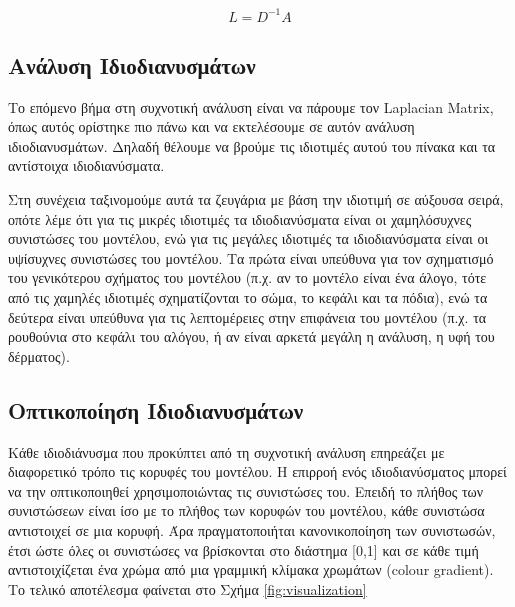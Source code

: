\documentclass[draft]{article}
\begin{document}
\[
	L = D^{-1}A
\]

\subsection{Ανάλυση Ιδιοδιανυσμάτων}
Το επόμενο βήμα στη συχνοτική ανάλυση είναι να πάρουμε τον Laplacian Matrix,
όπως αυτός ορίστηκε πιο πάνω και να εκτελέσουμε σε αυτόν ανάλυση ιδιοδιανυσμάτων.
Δηλαδή θέλουμε να βρούμε τις ιδιοτιμές αυτού του πίνακα και τα αντίστοιχα ιδιοδιανύσματα.

Στη συνέχεια ταξινομούμε αυτά τα ζευγάρια με βάση την ιδιοτιμή σε αύξουσα σειρά,
οπότε λέμε ότι για τις μικρές ιδιοτιμές τα ιδιοδιανύσματα είναι οι χαμηλόσυχνες
συνιστώσες του μοντέλου,
ενώ για τις μεγάλες ιδιοτιμές τα ιδιοδιανύσματα είναι οι υψίσυχνες συνιστώσες του μοντέλου.
Τα πρώτα είναι υπεύθυνα για τον σχηματισμό του γενικότερου σχήματος του μοντέλου
(π.χ. αν το μοντέλο είναι ένα άλογο, τότε από τις χαμηλές ιδιοτιμές σχηματίζονται το
σώμα, το κεφάλι και τα πόδια), ενώ τα δεύτερα είναι υπεύθυνα για τις λεπτομέρειες στην
επιφάνεια του μοντέλου (π.χ. τα ρουθούνια στο κεφάλι του αλόγου,
ή αν είναι αρκετά μεγάλη η ανάλυση, η υφή του δέρματος).

\subsection{Οπτικοποίηση Ιδιοδιανυσμάτων}
Κάθε ιδιοδιάνυσμα που προκύπτει από τη συχνοτική ανάλυση επηρεάζει με διαφορετικό τρόπο
τις κορυφές του μοντέλου. Η επιρροή ενός ιδιοδιανύσματος μπορεί να την οπτικοποιηθεί
χρησιμοποιώντας τις συνιστώσες του. Επειδή το πλήθος των συνιστώσεων είναι ίσο με το
πλήθος των κορυφών του μοντέλου, κάθε συνιστώσα αντιστοιχεί σε μια κορυφή.
Άρα πραγματοποιήται κανονικοποίηση των συνιστωσών, έτσι ώστε όλες οι συνιστώσες να
βρίσκονται στο διάστημα [0,1] και σε κάθε τιμή αντιστοιχίζεται ένα χρώμα
από μια γραμμική κλίμακα χρωμάτων (colour gradient). Το τελικό αποτέλεσμα φαίνεται στο
Σχήμα \ref{fig:visualization}
\end{document}
